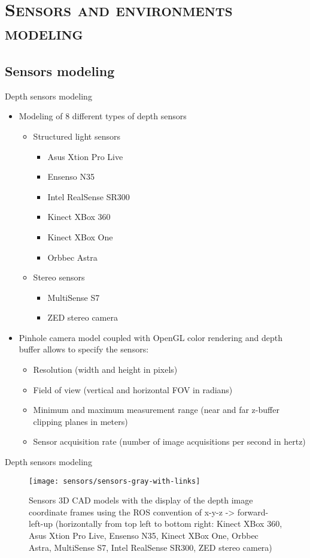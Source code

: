 \section{\scshape Sensors and environments modeling}
\subsection*{Sensors modeling}
\begin{frame}{Depth sensors modeling}
	\begin{itemize}
		\item Modeling of 8 different types of depth sensors
		\begin{itemize}
			\item Structured light sensors
			\begin{itemize}
				\item Asus Xtion Pro Live
				\item Ensenso N35
				\item Intel RealSense SR300
				\item Kinect XBox 360
				\item Kinect XBox One
				\item Orbbec Astra
			\end{itemize}
			\item Stereo sensors
			\begin{itemize}
				\item MultiSense S7
				\item ZED stereo camera
			\end{itemize}
		\end{itemize}
		\item Pinhole camera model coupled with OpenGL color rendering and depth buffer allows to specify the sensors:
		\begin{itemize}
			\item Resolution (width and height in pixels)
			\item Field of view (vertical and horizontal FOV in radians)
			\item Minimum and maximum measurement range (near and far z-buffer clipping planes in meters)
			\item Sensor acquisition rate (number of image acquisitions per second in hertz)
		\end{itemize}
	\end{itemize}
\end{frame}


\begin{frame}{Depth sensors modeling}
	\begin{figure}
		\centering
		\texttt{[image: sensors/sensors-gray-with-links]}
		\caption{Sensors 3D CAD models with the display of the depth image coordinate frames using the ROS convention of x-y-z -> forward-left-up (horizontally from top left to bottom right: Kinect XBox 360, Asus Xtion Pro Live, Ensenso N35, Kinect XBox One, Orbbec Astra, MultiSense S7, Intel RealSense SR300, ZED stereo camera)}
	\end{figure}
\end{frame}



